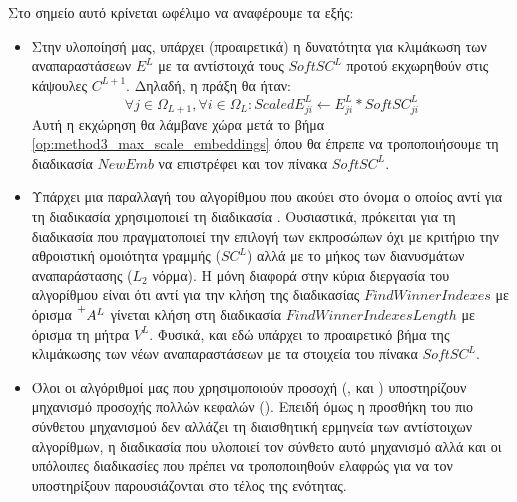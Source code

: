 Στο σημείο αυτό κρίνεται ωφέλιμο να αναφέρουμε τα εξής:
\begin{itemize}
  \item Στην υλοποίησή μας, υπάρχει (προαιρετικά) η δυνατότητα για κλιμάκωση των αναπαραστάσεων $E^L$ με τα αντίστοιχά τους $SoftSC^L$ προτού εκχωρηθούν στις κάψουλες $C^{L+1}$. Δηλαδή, η πράξη θα ήταν:
  \begin{equation}
    \label{eq:scaleEmb}
    \forall j \in \Omega_{L+1}, \forall i \in \Omega_{L}: ScaledE_{ji}^L \gets E_{ji}^L \ast SoftSC^L_{ji}
  \end{equation}
  Αυτή η εκχώρηση θα λάμβανε χώρα μετά το βήμα \ref{op:method3_max_scale_embeddings} όπου θα έπρεπε να τροποποιήσουμε τη διαδικασία $NewEmb$ να επιστρέφει και τον πίνακα $SoftSC^L$.
  \item Υπάρχει μια παραλλαγή του αλγορίθμου  που ακούει στο όνομα  ο οποίος αντί για τη διαδικασία  χρησιμοποιεί τη διαδικασία . Ουσιαστικά, πρόκειται για τη διαδικασία που πραγματοποιεί την επιλογή των εκπροσώπων όχι με κριτήριο την αθροιστική ομοιότητα γραμμής ($SC^L$) αλλά με το μήκος των διανυσμάτων αναπαράστασης ($L_2$ νόρμα). Η μόνη διαφορά στην κύρια διεργασία του αλγορίθμου είναι ότι αντί για την κλήση της διαδικασίας $FindWinnerIndexes$ με όρισμα $\prescript{+}{}{A^{L}}$ γίνεται κλήση στη διαδικασία $FindWinnerIndexesLength$ με όρισμα τη μήτρα $V^L$. Φυσικά, και εδώ υπάρχει το προαιρετικό βήμα της κλιμάκωσης των νέων αναπαραστάσεων με τα στοιχεία του πίνακα $SoftSC^L$.
  \item Όλοι οι αλγόριθμοί μας που χρησιμοποιούν προσοχή (,  και ) υποστηρίζουν μηχανισμό προσοχής πολλών κεφαλών (). Επειδή όμως η προσθήκη του πιο σύνθετου μηχανισμού δεν αλλάζει τη διαισθητική ερμηνεία των αντίστοιχων αλγορίθμων, η διαδικασία που υλοποιεί τον σύνθετο αυτό μηχανισμό αλλά και οι υπόλοιπες διαδικασίες που πρέπει να τροποποιηθούν ελαφρώς για να τον υποστηρίξουν παρουσιάζονται στο τέλος της ενότητας. 
\end{itemize}

